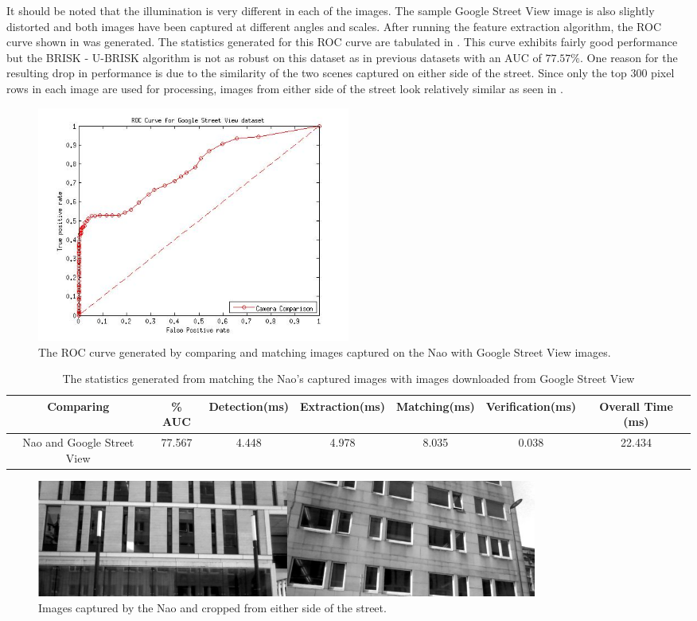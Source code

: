 \documentclass[11pt]{report}
\begin{document}
It should be noted that the illumination is very different in each of the images. The sample Google Street View image is also slightly distorted and both images have been captured at different angles and scales. After running the feature extraction algorithm, the ROC curve shown in  was generated. The statistics generated for this ROC curve are tabulated in . This curve exhibits fairly good performance but the BRISK - U-BRISK algorithm is not as robust on this dataset as in previous datasets with an AUC of $77.57\%$. One reason for the resulting drop in performance is due to the similarity of the two scenes captured on either side of the street. Since only the top $300$ pixel rows in each image are used for processing, images from either side of the street look relatively similar as seen in .\\

 \begin{figure}[h!] 
  \centering
    \includegraphics[width=0.5\textwidth]{../Drawings/streetView/ROC_StreetView.jpg}
    \caption{The ROC curve generated by comparing and matching images captured on the Nao with Google Street View images.}
    \label{fig:rocGoogleStreet}
\end{figure}

\begin{table}
\caption{The statistics generated from matching the Nao's captured images with
images downloaded from Google Street View}
\begin{tabular}{|c|c|c|c|c|c|c|}
\hline 
Comparing & \% AUC & Detection(ms) & Extraction(ms) & Matching(ms) & Verification(ms) & Overall Time (ms)\tabularnewline
\hline 
\hline 
Nao and Google Street View & 77.567 & 4.448 & 4.978 & 8.035 & 0.038 & 22.434\tabularnewline
\hline 
\end{tabular}
\label{tab:naoGoogleStreetRoc}
\end{table}

 \begin{figure}[h!] 
  \centering
    \includegraphics[width=0.8\textwidth]{../Drawings/streetView/similarGooglePics.jpg}
    \caption{Images captured by the Nao and cropped from either side of the street.}
    \label{fig:similarGoogleStreetView}
\end{figure}
\end{document}
